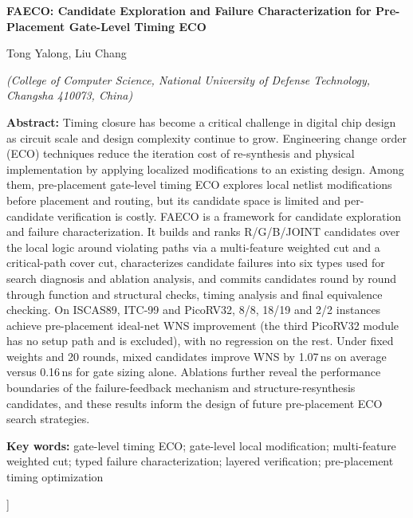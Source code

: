 \documentclass[twocolumn,10pt,fontset=windows]{ctexart}
\begin{document}
\begin{center}
{\bfseries\fontsize{12.5}{16}\selectfont FAECO: Candidate Exploration and Failure Characterization for Pre-Placement Gate-Level Timing ECO}\par
\vspace{3pt}
{\normalsize Tong Yalong, Liu Chang\par}
\vspace{3pt}
{\small \itshape (College of Computer Science, National University of Defense Technology, Changsha 410073, China)}\par
\vspace{4pt}
\end{center}
\begin{flushleft}
  {\bfseries Abstract:} {\small Timing closure has become a critical challenge in digital chip design as circuit scale and design complexity continue to grow. Engineering change order (ECO) techniques reduce the iteration cost of re-synthesis and physical implementation by applying localized modifications to an existing design. Among them, pre-placement gate-level timing ECO explores local netlist modifications before placement and routing, but its candidate space is limited and per-candidate verification is costly. FAECO is a framework for candidate exploration and failure characterization. It builds and ranks R/G/B/JOINT candidates over the local logic around violating paths via a multi-feature weighted cut and a critical-path cover cut, characterizes candidate failures into six types used for search diagnosis and ablation analysis, and commits candidates round by round through function and structural checks, timing analysis and final equivalence checking. On ISCAS89, ITC-99 and PicoRV32, 8/8, 18/19 and 2/2 instances achieve pre-placement ideal-net WNS improvement (the third PicoRV32 module has no setup path and is excluded), with no regression on the rest. Under fixed weights and 20 rounds, mixed candidates improve WNS by 1.07\,ns on average versus 0.16\,ns for gate sizing alone. Ablations further reveal the performance boundaries of the failure-feedback mechanism and structure-resynthesis candidates, and these results inform the design of future pre-placement ECO search strategies.}\par
\vspace{3pt}
{\bfseries Key words:} {\small gate-level timing ECO; gate-level local modification; multi-feature weighted cut; typed failure characterization; layered verification; pre-placement timing optimization}\par
\end{flushleft}
]%
\end{document}
